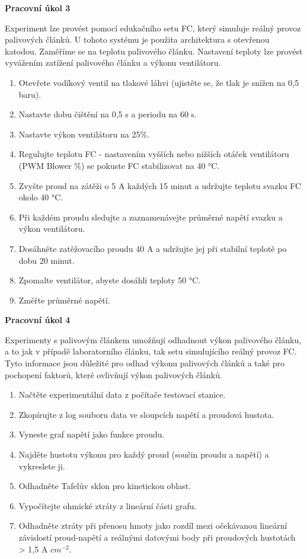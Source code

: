 \textbf{Pracovní úkol 3}

Experiment lze provést pomocí edukačního setu FC, který simuluje reálný provoz palivových článků. U tohoto systému je použita architektura s otevřenou katodou. Zaměříme se na teplotu palivového článku. Nastavení teploty lze provést vyvážením zatížení palivového článku a výkonu ventilátoru.

\begin{enumerate}
\item Otevřete vodíkový ventil na tlakové láhvi (ujistěte se, že tlak je snížen na 0,5 baru).
\item Nastavte dobu čištění na 0,5 s a periodu na 60 s.
\item Nastavte výkon ventilátoru na 25\%.
\item Regulujte teplotu FC - nastavením vyšších nebo nižších otáček ventilátoru (PWM Blower \%) se pokuste FC stabilizovat na 40 °C.
\item Zvyšte proud na zátěži o 5 A každých 15 minut a udržujte teplotu svazku FC okolo 40 °C.
\item Při každém proudu sledujte a zaznamenávejte průměrné napětí svazku a výkon ventilátoru.
\item Dosáhněte zatěžovacího proudu 40 A a udržujte jej při stabilní teplotě po dobu 20 minut.
\item Zpomalte ventilátor, abyste dosáhli teploty 50 °C.
\item Změřte průměrné napětí. 
\end{enumerate}

\textbf{Pracovní úkol 4}

Experimenty s palivovým článkem umožňují odhadnout výkon palivového článku, a to jak v případě laboratorního článku, tak setu simulujícího reálný provoz FC. Tyto informace jsou důležité pro odhad výkonu palivových článků a také pro pochopení faktorů, které ovlivňují výkon palivových článků.


\begin{enumerate}
\item Načtěte experimentální data z počítače testovací stanice.
\item Zkopírujte z log souboru data ve sloupcích napětí a proudová hustota.
\item Vyneste graf napětí jako funkce proudu.
\item Najděte hustotu výkonu pro každý proud (součin proudu a napětí) a vykreslete ji.
\item Odhadněte Tafelův sklon pro kinetickou oblast.
\item Vypočítejte ohmické ztráty z lineární části grafu.
\item Odhadněte ztráty při přenosu hmoty jako rozdíl mezi očekávanou lineární závislostí proud-napětí a reálnými datovými body při proudových hustotách > 1,5 A $cm^{-2}$.
\end{enumerate}


